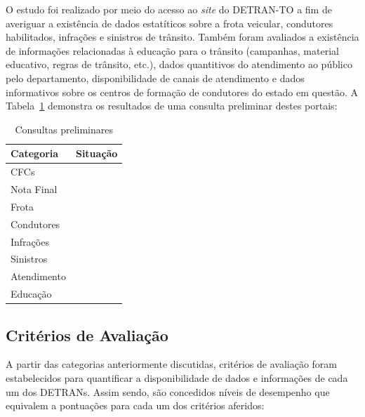 \documentclass[
  a4paper,
]{article}
\begin{document}
O estudo foi realizado por meio do acesso ao \emph{site} do DETRAN-TO a
fim de averiguar a existência de dados estatíticos sobre a frota
veicular, condutores habilitados, infrações e sinistros de trânsito.
Também foram avaliados a existência de informações relacionadas à
educação para o trânsito (campanhas, material educativo, regras de
trânsito, etc.), dados quantitivos do atendimento ao público pelo
departamento, disponibilidade de canais de atendimento e dados
informativos sobre os centros de formação de condutores do estado em
questão. A Tabela~\ref{tbl-consultas} demonstra os resultados de uma
consulta preliminar destes portais:

\begin{longtable}{lc}

\caption{\label{tbl-consultas}Consultas preliminares}

\tabularnewline

\toprule
Categoria & Situação \\ 
\midrule\addlinespace[2.5pt]
CFCs & \cellcolor[HTML]{1FA149}{\textcolor[HTML]{FFFFFF}{Presente}} \\ 
Nota Final & \cellcolor[HTML]{1FA149}{\textcolor[HTML]{FFFFFF}{Presente}} \\ 
Frota & \cellcolor[HTML]{D7191C}{\textcolor[HTML]{FFFFFF}{Ausente}} \\ 
Condutores & \cellcolor[HTML]{D7191C}{\textcolor[HTML]{FFFFFF}{Ausente}} \\ 
Infrações & \cellcolor[HTML]{D7191C}{\textcolor[HTML]{FFFFFF}{Ausente}} \\ 
Sinistros & \cellcolor[HTML]{D7191C}{\textcolor[HTML]{FFFFFF}{Ausente}} \\ 
Atendimento & \cellcolor[HTML]{1FA149}{\textcolor[HTML]{FFFFFF}{Presente}} \\ 
Educação & \cellcolor[HTML]{1FA149}{\textcolor[HTML]{FFFFFF}{Presente}} \\ 
\bottomrule

\end{longtable}

\subsection{Critérios de
Avaliação}\label{crituxe9rios-de-avaliauxe7uxe3o}

A partir das categorias anteriormente discutidas, critérios de avaliação
foram estabelecidos para quantificar a disponibilidade de dados e
informações de cada um dos DETRANs. Assim sendo, são concedidos níveis
de desempenho que equivalem a pontuações para cada um dos critérios
aferidos:
\end{document}
